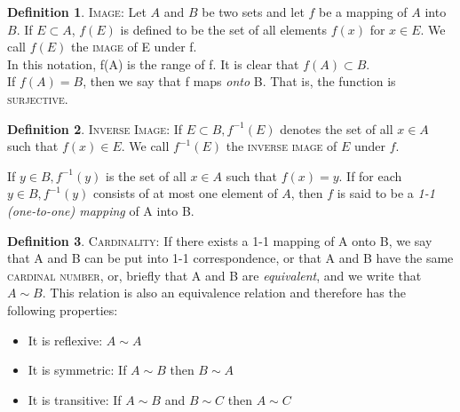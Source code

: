 \documentclass{tufte-book}
\theoremstyle{definition}
\newtheorem{definition}{Definition}[chapter]
\numberwithin{section}{chapter}
\begin{document}
\begin{definition}\textsc{Image:}  Let $A$ and $B$ be two sets and let $f$ be a mapping of $A$ into $B$.   If $E \subset A$,  $f(E)$ is defined to be the set of all elements $f(x)$ for $x \in E$.   We call $f(E)$ the \textsc{image} of E under f.  \\In this notation, f(A) is the range of f.  It is clear that $f(A) \subset B$.  \\If $f(A) = B$, then we say that f maps \emph{onto} B.  That is, the function is \textsc{surjective}.\end{definition}
\bigskip


\begin{definition}\textsc{Inverse Image:}  If $E \subset B, f^{-1}(E)$ denotes the set of all $x \in A$ such that $f(x) \in E$.  We call $f^{-1}(E)$ the \textsc{inverse image} of $E$ under $f$.  \\


If $y \in B, f^{-1}(y)$ is the set of all $x\in A$ such that $f(x) = y$.  If for each $y \in B, f^{-1}(y)$ consists of at most one element of $A$, then $f$ is said to be a \emph{1-1 (one-to-one) mapping} of A into B. \end{definition}
\bigskip


\begin{definition}\textsc{Cardinality:}  If there exists a 1-1 mapping of A onto B, we say that A and B can be put into 1-1 correspondence, or that A and B have the same \textsc{cardinal number}, or, briefly that A and B are \emph{equivalent}, and we write that $A \sim B $.  This relation is also an equivalence relation and therefore has the following properties:
	\begin{itemize}
	\item It is reflexive:  $A \sim A$
	\item It is symmetric:  If $A \sim B$ then $B \sim A$
	\item It is transitive:  If $A \sim B$ and $B\sim C$ then $A \sim C$
\end{itemize}\end{definition}
\bigskip
\end{document}
